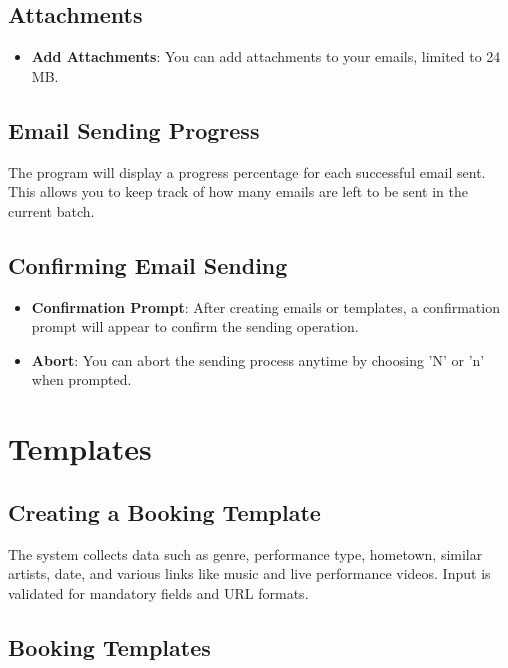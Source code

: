 \documentclass{article}
\begin{document}
	\subsection{Attachments}
	
	\begin{itemize}
		\item \textbf{Add Attachments}: You can add attachments to your emails, limited to 24 MB.
	\end{itemize}
	
	\subsection{Email Sending Progress}
	
	The program will display a progress percentage for each successful email sent. This allows you to keep track of how many emails are left to be sent in the current batch.
	
	\subsection{Confirming Email Sending}
	
	\begin{itemize}
		\item \textbf{Confirmation Prompt}: After creating emails or templates, a confirmation prompt will appear to confirm the sending operation.
		\item \textbf{Abort}: You can abort the sending process anytime by choosing 'N' or 'n' when prompted.
	\end{itemize}
	
	\section{Templates}
	
	\subsection{Creating a Booking Template}
	
	The system collects data such as genre, performance type, hometown, similar artists, date, and various links like music and live performance videos. Input is validated for mandatory fields and URL formats.
	
	\subsection{Booking Templates}
	
\end{document}
